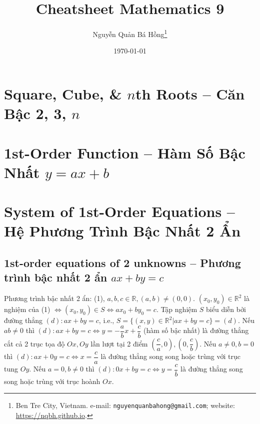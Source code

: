 \documentclass{article}
\title{Cheatsheet Mathematics 9}
\author{Nguyễn Quản Bá Hồng\footnote{Ben Tre City, Vietnam. e-mail: \texttt{nguyenquanbahong@gmail.com}; website: \url{https://nqbh.github.io}.}}
\date{\today}
\begin{document}
\maketitle
\tableofcontents


\section{Square, Cube, \& $n$th Roots -- Căn Bậc 2, 3, $n$}


\section{1st-Order Function -- Hàm Số Bậc Nhất $y = ax + b$}


\section{System of 1st-Order Equations -- Hệ Phương Trình Bậc Nhất 2 Ẩn}

\subsection{1st-order equations of 2 unknowns -- Phương trình bậc nhất 2 ẩn $ax + by = c$}
 Phương trình bậc nhất 2 ẩn:  (1), $a,b,c\in\mathbb{R},(a,b)\ne(0,0)$.  $(x_0,y_0)\in\mathbb{R}^2$ là nghiệm của (1) $\Leftrightarrow(x_0,y_0)\in S\Leftrightarrow ax_0 + by_0 = c$.  Tập nghiệm $S$ biểu diễn bởi đường thẳng $(d):ax + by = c$, i.e., $S = \{(x,y)\in\mathbb{R}^2|ax + by = c\} = (d)$.  Nếu $ab\ne0$ thì $(d):ax + by = c\Leftrightarrow y = -\dfrac{a}{b}x + \dfrac{c}{b}$ (hàm số bậc nhất) là đường thẳng cắt cả 2 trục tọa độ $Ox,Oy$ lần lượt tại 2 điểm $\left(\dfrac{c}{a},0\right),\left(0,\dfrac{c}{b}\right)$.  Nếu $a\ne0,b = 0$ thì $(d):ax + 0y = c\Leftrightarrow x = \dfrac{c}{a}$ là đường thẳng song song hoặc trùng với trục tung $Oy$.  Nếu $a = 0,b\ne0$ thì $(d):0x + by = c\Leftrightarrow y = \dfrac{c}{b}$ là đường thẳng song song hoặc trùng với trục hoành $Ox$.

\end{document}
